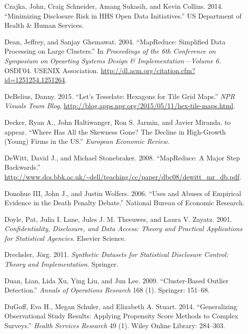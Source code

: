 \documentclass[]{krantz}
\begin{document}
\hypertarget{ref-czajka2014minimizing}{}
Czajka, John, Craig Schneider, Amang Sukasih, and Kevin Collins. 2014.
``Minimizing Disclosure Risk in HHS Open Data Initiatives.'' US
Department of Health \& Human Services.

\hypertarget{ref-MapReduce}{}
Dean, Jeffrey, and Sanjay Ghemawat. 2004. ``MapReduce: Simplified Data
Processing on Large Clusters.'' In \emph{Proceedings of the 6th
Conference on Symposium on Opearting Systems Design \&
Implementation---Volume 6}. OSDI'04. USENIX Association.
\url{http://dl.acm.org/citation.cfm?id=1251254.1251264}.

\hypertarget{ref-DeBelius2015}{}
DeBelius, Danny. 2015. ``Let's Tesselate: Hexagons for Tile Grid Maps.''
\emph{NPR Visuals Team Blog},
\url{http://blog.apps.npr.org/2015/05/11/hex-tile-maps.html}.

\hypertarget{ref-decker2015has}{}
Decker, Ryan A., John Haltiwanger, Ron S. Jarmin, and Javier Miranda. to
appear. ``Where Has All the Skewness Gone? The Decline in High-Growth
(Young) Firms in the US.'' \emph{European Economic Review}.

\hypertarget{ref-MapReduceBad}{}
DeWitt, David J., and Michael Stonebraker. 2008. ``MapReduce: A Major
Step Backwards.''
\url{http://www.dcs.bbk.ac.uk/~dell/teaching/cc/paper/dbc08/dewitt_mr_db.pdf}.

\hypertarget{ref-donohue2006uses}{}
Donohue III, John J., and Justin Wolfers. 2006. ``Uses and Abuses of
Empirical Evidence in the Death Penalty Debate.'' National Bureau of
Economic Research.

\hypertarget{ref-doyle2001confidentiality}{}
Doyle, Pat, Julia I. Lane, Jules J. M. Theeuwes, and Laura V. Zayatz.
2001. \emph{Confidentiality, Disclosure, and Data Access: Theory and
Practical Applications for Statistical Agencies}. Elsevier Science.

\hypertarget{ref-drechsler2011synthetic}{}
Drechsler, Jörg. 2011. \emph{Synthetic Datasets for Statistical
Disclosure Control: Theory and Implementation}. Springer.

\hypertarget{ref-duan2009cluster}{}
Duan, Lian, Lida Xu, Ying Liu, and Jun Lee. 2009. ``Cluster-Based
Outlier Detection.'' \emph{Annals of Operations Research} 168 (1).
Springer: 151--68.

\hypertarget{ref-dugoff2014generalizing}{}
DuGoff, Eva H., Megan Schuler, and Elizabeth A. Stuart. 2014.
``Generalizing Observational Study Results: Applying Propensity Score
Methods to Complex Surveys.'' \emph{Health Services Research} 49 (1).
Wiley Online Library: 284--303.
\end{document}
